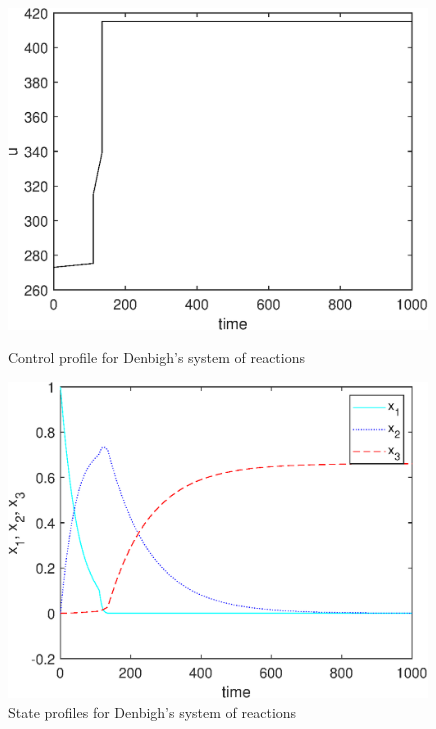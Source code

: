 \documentclass[a4paper,12pt,oneside]{book}
\begin{document}
\begin{figure}[htb]
	\begin{minipage}[t]{0.5\linewidth}
		\centering
		\includegraphics[width=0.99\textwidth]{examples/problem-denbigh_reactions/u_denbigh.eps}
		\caption[Tutorial example 6: control profile]{Control profile for
			Denbigh's system of reactions}\label{fig:probdenbigh_u} 
	\end{minipage}
	\begin{minipage}[t]{0.5\linewidth}
		\centering
		\includegraphics[width=0.99\textwidth]{examples/problem-denbigh_reactions/x_denbigh.eps}
		\caption[Tutorial example 6: state profiles]{State profiles for Denbigh's system of reactions}\label{fig:probdenbigh_x} 
	\end{minipage}
\end{figure}	
	
	
	
	
\end{document}
